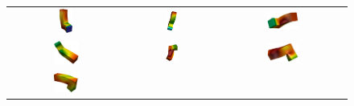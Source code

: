 \begin{figure}[hbtp]
	\centering
	\begin{tabular}{ccc}
		\includegraphics[width=0.12\textwidth]{Figures/Example1/Temperature/TS25v2} &
		\includegraphics[width=0.13\textwidth]{Figures/Example1/Temperature/TS50v2} &
		\includegraphics[width=0.27\textwidth]{Figures/Example1/Temperature/TS80v2} \\
		\includegraphics[width=0.23\textwidth]{Figures/Example1/Temperature/TS110v2} &
		\includegraphics[width=0.15\textwidth]{Figures/Example1/Temperature/TS150v2} &
		\includegraphics[width=0.26\textwidth]{Figures/Example1/Temperature/TS190v2} \\ 	
		\includegraphics[width=0.22\textwidth]{Figures/Example1/Temperature/TS210v2} &

\end{tabular}
\end{figure}
